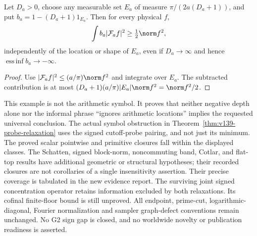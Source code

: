 \begin{proposition}
\label{prop:v139-location-counterexample}
Let $D_a>0$, choose any measurable set $E_a$ of measure
$\pi/(2a(D_a+1))$, and put
$b_a=1-(D_a+1)1_{E_a}$. Then for every physical $f$,
\[
 \int b_a|\mathcal F_af|^2\ge\tfrac12\norm f^2,
\]
independently of the location or shape of $E_a$, even if
$D_a\to\infty$ and hence $\operatorname*{ess\,inf}b_a\to-\infty$.
\end{proposition}
\begin{proof}
Use $|\mathcal F_af|^2\le(a/\pi)\norm f^2$ and integrate over
$E_a$. The subtracted contribution is at most
$(D_a+1)(a/\pi)|E_a|\norm f^2=\norm f^2/2$.
\end{proof}

This example is not the arithmetic symbol. It proves that neither
negative depth alone nor the informal phrase ``ignores arithmetic
locations'' implies the requested universal conclusion. The actual
symbol obstruction in Theorem~\ref{thm:v139-probe-relaxation} uses
the signed cutoff-probe pairing, and not just its minimum.
The proved scalar pointwise and primitive closures fall within the
displayed classes. The Schatten, signed block-norm, noncommuting
band, Cotlar, and flat-top results have additional geometric or
structural hypotheses; their recorded closures are not corollaries
of a single insensitivity assertion. Their precise coverage is
tabulated in the new evidence report. The surviving joint signed
concentration operator retains information excluded by both
relaxations. Its cofinal finite-floor bound is still unproved.
All endpoint, prime-cut, logarithmic-diagonal, Fourier normalization
and sampler graph-defect conventions remain unchanged. No G2 sign
gap is closed, and no worldwide novelty or publication readiness is
asserted.
